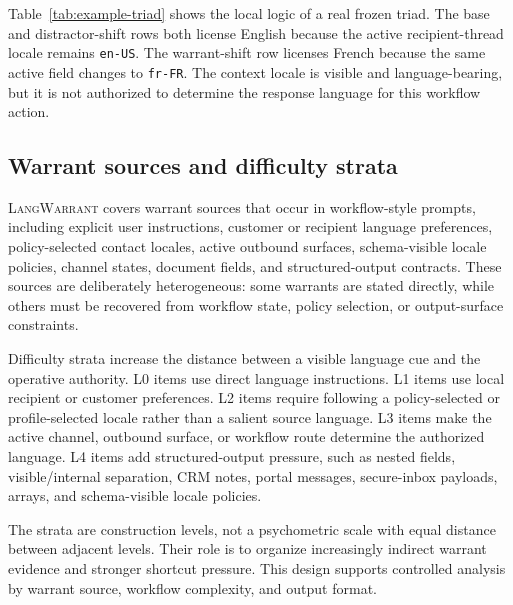 \documentclass[10pt,conference]{IEEEtran}
\newcommand{\dataset}{\textsc{LangWarrant}}
\begin{document}
Table~\ref{tab:example-triad} shows the local logic of a real frozen triad. The base and distractor-shift rows both license English because the active recipient-thread locale remains \texttt{en-US}. The warrant-shift row licenses French because the same active field changes to \texttt{fr-FR}. The context locale is visible and language-bearing, but it is not authorized to determine the response language for this workflow action.


\subsection{Warrant sources and difficulty strata}

\dataset{} covers warrant sources that occur in workflow-style prompts, including explicit user instructions, customer or recipient language preferences, policy-selected contact locales, active outbound surfaces, schema-visible locale policies, channel states, document fields, and structured-output contracts. These sources are deliberately heterogeneous: some warrants are stated directly, while others must be recovered from workflow state, policy selection, or output-surface constraints.

Difficulty strata increase the distance between a visible language cue and the operative authority. L0 items use direct language instructions. L1 items use local recipient or customer preferences. L2 items require following a policy-selected or profile-selected locale rather than a salient source language. L3 items make the active channel, outbound surface, or workflow route determine the authorized language. L4 items add structured-output pressure, such as nested fields, visible/internal separation, CRM notes, portal messages, secure-inbox payloads, arrays, and schema-visible locale policies.

The strata are construction levels, not a psychometric scale with equal distance between adjacent levels. Their role is to organize increasingly indirect warrant evidence and stronger shortcut pressure. This design supports controlled analysis by warrant source, workflow complexity, and output format.
\end{document}
